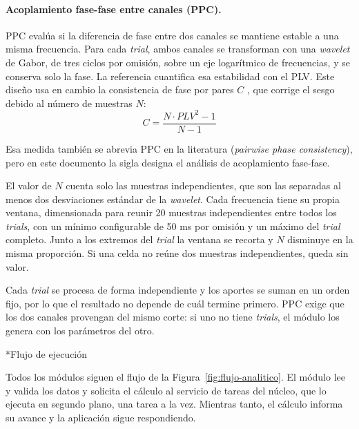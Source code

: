 \documentclass[12pt,letterpaper,oneside]{article}
\makeatletter
\newcommand{\subsubsubsection}[1]{%
  \@startsection{paragraph}{4}{\z@}{10pt plus 2pt minus 1pt}{4pt}%
    {\normalfont\normalsize\bfseries\itshape}*{#1}}
\makeatother
\begin{document}
\paragraph{Acoplamiento fase-fase entre canales (PPC).}

PPC evalúa si la diferencia de fase entre dos canales se mantiene estable a una misma frecuencia. Para cada \textit{trial}, ambos canales se transforman con una \textit{wavelet} de Gabor, de tres ciclos por omisión, sobre un eje logarítmico de frecuencias, y se conserva solo la fase. La referencia cuantifica esa estabilidad con el PLV. Este diseño usa en cambio la consistencia de fase por pares $C$ \cite{vinck2010}, que corrige el sesgo debido al número de muestras $N$:
\[
  C = \frac{N\cdot PLV^2 - 1}{N - 1}
\]

Esa medida también se abrevia PPC en la literatura (\textit{pairwise phase consistency}), pero en este documento la sigla designa el análisis de acoplamiento fase-fase.

El valor de $N$ cuenta solo las muestras independientes, que son las separadas al menos dos desviaciones estándar de la \textit{wavelet}. Cada frecuencia tiene su propia ventana, dimensionada para reunir 20 muestras independientes entre todos los \textit{trials}, con un mínimo configurable de 50 ms por omisión y un máximo del \textit{trial} completo. Junto a los extremos del \textit{trial} la ventana se recorta y $N$ disminuye en la misma proporción. Si una celda no reúne dos muestras independientes, queda sin valor.

Cada \textit{trial} se procesa de forma independiente y los aportes se suman en un orden fijo, por lo que el resultado no depende de cuál termine primero. PPC exige que los dos canales provengan del mismo corte: si uno no tiene \textit{trials}, el módulo los genera con los parámetros del otro.

\subsubsubsection{Flujo de ejecución}

Todos los módulos siguen el flujo de la Figura~\ref{fig:flujo-analitico}. El módulo lee y valida los datos y solicita el cálculo al servicio de tareas del núcleo, que lo ejecuta en segundo plano, una tarea a la vez. Mientras tanto, el cálculo informa su avance y la aplicación sigue respondiendo.
\end{document}
